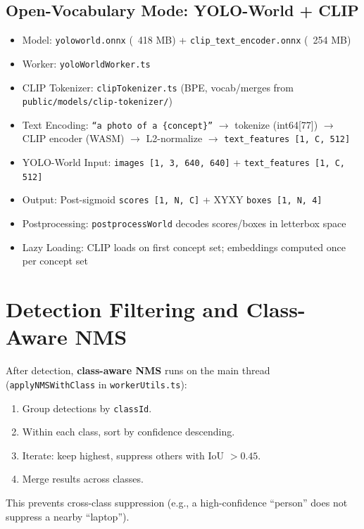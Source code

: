 \subsection{Open-Vocabulary Mode: YOLO-World + CLIP}
\label{sec:yolo-open}
\begin{itemize}
    \item Model: \texttt{yoloworld.onnx} (~418 MB) + \texttt{clip\_text\_encoder.onnx} (~254 MB)
    \item Worker: \texttt{yoloWorldWorker.ts}
    \item CLIP Tokenizer: \texttt{clipTokenizer.ts} (BPE, vocab/merges from \texttt{public/models/clip-tokenizer/})
    \item Text Encoding: \texttt{``a photo of a \{concept\}''} $\to$ tokenize (int64[77]) $\to$ CLIP encoder (WASM) $\to$ L2-normalize $\to$ \texttt{text\_features [1, C, 512]}
    \item YOLO-World Input: \texttt{images [1, 3, 640, 640]} + \texttt{text\_features [1, C, 512]}
    \item Output: Post-sigmoid \texttt{scores [1, N, C]} + XYXY \texttt{boxes [1, N, 4]}
    \item Postprocessing: \texttt{postprocessWorld} decodes scores/boxes in letterbox space
    \item Lazy Loading: CLIP loads on first concept set; embeddings computed once per concept set
\end{itemize}

\section{Detection Filtering and Class-Aware NMS}
\label{sec:nms}

After detection, \textbf{class-aware NMS} runs on the main thread (\texttt{applyNMSWithClass} in \texttt{workerUtils.ts}):

\begin{enumerate}
    \item Group detections by \texttt{classId}.
    \item Within each class, sort by confidence descending.
    \item Iterate: keep highest, suppress others with IoU $> 0.45$.
    \item Merge results across classes.
\end{enumerate}

This prevents cross-class suppression (e.g., a high-confidence ``person'' does not suppress a nearby ``laptop'').

